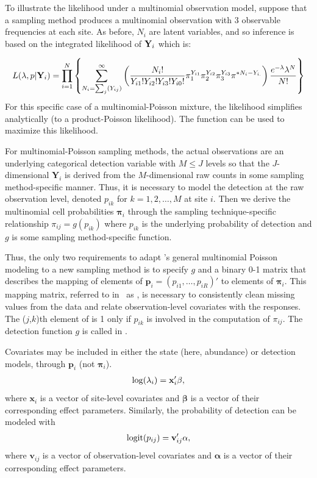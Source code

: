 \documentclass[article,shortnames]{jss}
\DeclareMathOperator{\logit}{logit}
\newcommand{\um}{\pkg{unmarked}}
\begin{document}
To illustrate the likelihood under a multinomial observation model, 
suppose that a sampling method produces a multinomial observation 
with 3 observable frequencies at each site. As before, $N_{i}$ are 
latent variables, and so inference is based on the integrated 
likelihood of ${\bf Y}_{i}$ which is:

\begin{equation}
L(\lambda, p | {\bf Y}_i) = 
 \prod_{i=1}^{N} \left\{ 
  \sum_{N_{i}=\sum_{j}(Y_{ij})}^{\infty} \left(
 \frac{N_{i}!}{ Y_{i1}! Y_{i2}! Y_{i3}! Y_{i0}!}
  \pi_{1}^{Y_{i1}}
  \pi_{2}^{Y_{i2}}
  \pi_{3}^{Y_{i3}}
  \pi^{*N_{i}- Y_{i.}} \right)
 \frac{e^{-\lambda} \lambda^N}{N!} \right\}
\end{equation}
For this specific case of a multinomial-Poisson mixture, the likelihood 
simplifies analytically (to a product-Poisson likelihood).
The function  can be used to maximize this likelihood.

For multinomial-Poisson sampling methods, the actual observations are
an underlying categorical detection variable with $M \leq J$ levels so
that the $J$-dimensional $\mathbf Y_{i}$ is derived from the
$M$-dimensional raw counts in some sampling method-specific manner.
Thus, it is necessary to model the detection at the raw observation
level, denoted $p_{ik}$ for $k=1,2,\dots,M$ at site $i$.  Then we
derive the multinomial cell probabilities $\boldsymbol \pi_{i}$
through the sampling technique-specific relationship
$\pi_{ij}=g(p_{ik})$ where $p_{ik}$ is the underlying probability of
detection and $g$ is some sampling method-specific function.  

Thus, the only two requirements to adapt \um's general multinomial Poisson
modeling to a new sampling method is to specify $g$ and a binary 0-1
matrix that describes the mapping of elements of
$\mathbf p_{i} = (p_{i1},\dots,p_{iR})'$ to elements of
$\boldsymbol \pi_{i}$.  This mapping matrix, referred to in
\um\ as , is necessary to consistently clean
missing values from the data and relate observation-level covariates
with the responses.  The ($j$,$k$)th element of
 is 1 only if $p_{ik}$ is involved in the computation of
$\pi_{ij}$.  The detection function $g$ is called  in \um.

Covariates may be included in either the
state (here, abundance) or detection models, through $\mathbf p_{i}$
(not $\boldsymbol \pi_{i}$).
\begin{gather}
  \log(\lambda_i) = \mathbf x_i' \mathbf \beta, \notag
\end{gather}
where $\mathbf x_i$ is a vector of site-level covariates and $\mathbf \beta$
is a vector of their corresponding effect parameters.  Similarly, the
probability of detection can be modeled with
\begin{gather}
  \logit(p_{ij}) = \mathbf v_{ij}' \mathbf \alpha, \notag
\end{gather}
where $\mathbf v_{ij}$ is a vector of observation-level covariates and
$\mathbf \alpha$ is a vector of their corresponding effect parameters.
\end{document}
